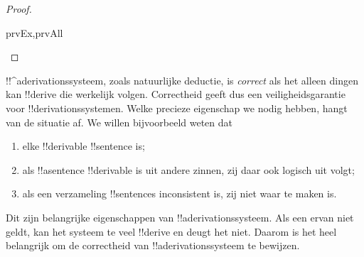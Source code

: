 \documentclass[openany]{memoir}
\begin{document}
\begin{proof}
\begin{tagenumerate}{prvEx,prvAll}

\end{tagenumerate}
\end{proof}
\endgroup

\begingroup
\def\olfilename{OLP-0095}
\def\olfilepath{content/first-order-logic/natural-deduction/}
\hypertarget{unit-OLP-0095}{}



      {}
      {}
      

\begin{explain}
!!^a{derivation}ssysteem, zoals natuurlijke deductie, is
\emph{correct} als het alleen dingen kan !!{derive} die werkelijk
volgen. Correctheid geeft dus een veiligheidsgarantie voor
!!{derivation}ssystemen. Welke precieze eigenschap we nodig hebben,
hangt van de situatie af. We willen bijvoorbeeld weten dat
\begin{enumerate}
\item elke !!{derivable} !!{sentence}
   is;
\item als !!a{sentence} !!{derivable} is uit andere zinnen, zij daar
  ook logisch uit volgt;
\item als een verzameling !!{sentence}s inconsistent is, zij niet waar
  te maken is.
\end{enumerate}
Dit zijn belangrijke eigenschappen van !!a{derivation}ssysteem. Als
een ervan niet geldt, kan het systeem te veel !!{derive} en deugt het
niet. Daarom is het heel belangrijk om de correctheid van
!!a{derivation}ssysteem te bewijzen.
\end{explain}
\end{document}
